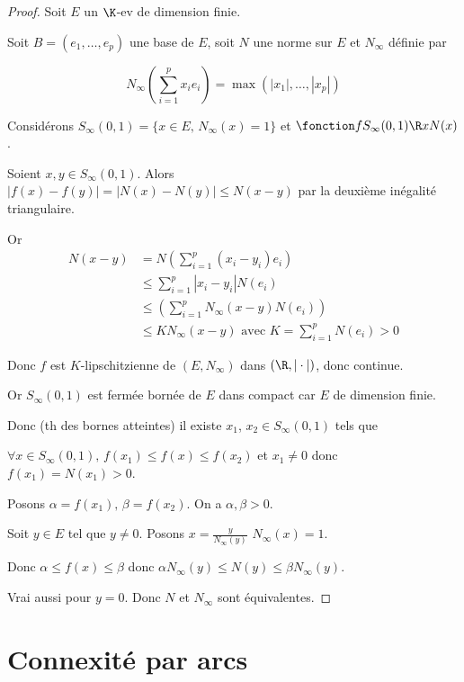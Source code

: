 \begin{proof}
    Soit $E$ un $\K$-ev de dimension finie. 

    Soit $B = (e_1, \ldots, e_p)$ une base de $E$, soit $N$ une norme sur $E$ et $N_\infty$ définie par 
    
    $$N_\infty \left( \sum_{i=1}^p x_i e_i \right) = \max(|x_1|, \ldots, |x_p|)$$

    Considérons $S_\infty (0, 1) = \{ x \in E, \, N_\infty(x) = 1 \}$ et 
    $\fonction f {S_\infty(0, 1)}{\R}{x}{N(x)}$.

    Soient $x, y \in S_\infty(0, 1)$. Alors $| f(x) - f(y)| = |N(x) - N(y)| \leqslant N(x - y)$ par la deuxième inégalité triangulaire. 

    Or \begin{align*}
        N(x - y) & = N\left( \sum_{i=1}^p (x_i - y_i) e_i \right) \\
        & \leqslant \sum_{i=1}^p |x_i - y_i| N(e_i) \\
        & \leqslant \left( \sum_{i=1}^p N_\infty(x - y) N(e_i) \right) \\
        & \leqslant K N_\infty(x - y) \text{ avec } K = \sum_{i=1}^p N(e_i) > 0
    \end{align*}

    Donc $f$ est $K$-lipschitzienne de $(E, N_\infty)$ dans $(\R, |\cdot |)$, donc continue.

    Or $S_\infty(0, 1)$ est fermée bornée de $E$ dans compact car $E$ de dimension finie. 

    Donc (th des bornes atteintes) il existe $x_1$, $x_2 \in S_\infty(0, 1)$ tels que

    $\forall x \in S_\infty(0, 1), \, f(x_1) \leqslant f(x) \leqslant f(x_2)$ et 
    $x_1 \neq 0$ donc $f(x_1) = N(x_1) > 0$. 

    Posons $ \alpha = f(x_1), \, \beta = f(x_2)$. On a $\alpha, \beta > 0$. 

    Soit $y \in E$ tel que $y \neq 0$. Posons $x = \frac y {N_\infty(y)}$ $N_\infty(x) = 1$.

    Donc $\alpha \leqslant f(x) \leqslant \beta$ donc $\alpha N_\infty(y) \leqslant N(y) \leqslant \beta N_\infty(y)$.

    Vrai aussi pour $y = 0$. Donc $N$ et $N_\infty$ sont équivalentes.
\end{proof}


\section{Connexité par arcs}

